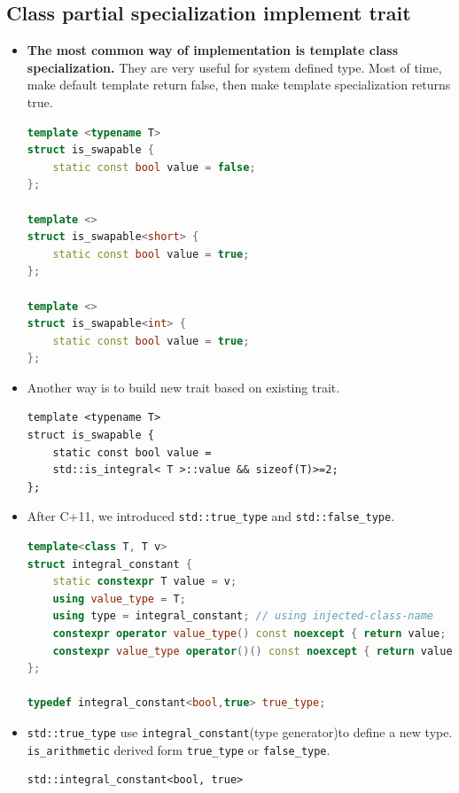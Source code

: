 \documentclass[a4paper,11pt,twoside]{book}
\begin{document}
\subsection{Class partial specialization implement trait}
\begin{itemize}
	
	\item \textbf{The most common way of implementation is template class specialization.} They are very useful for system defined type. Most of time, make default template return false, then make template specialization returns true. 
\begin{lstlisting}[frame=single, language=c++]
template <typename T>
struct is_swapable {
	static const bool value = false;
};

template <>
struct is_swapable<short> {
	static const bool value = true;
};

template <>
struct is_swapable<int> {
	static const bool value = true;
};
\end{lstlisting}

\item Another way is to build new trait based on existing trait.
\begin{lstlisting}[numbers=none]
template <typename T>
struct is_swapable {
	static const bool value = 
	std::is_integral< T >::value && sizeof(T)>=2;
};
\end{lstlisting}

	\item After C+11, we introduced \texttt{std::true\_type} and \texttt{std::false\_type}.
\begin{lstlisting}[frame=single, language=c++]
template<class T, T v>
struct integral_constant {
	static constexpr T value = v;
	using value_type = T;
	using type = integral_constant; // using injected-class-name
	constexpr operator value_type() const noexcept { return value; }
	constexpr value_type operator()() const noexcept { return value; } //since c++14
};
	
typedef integral_constant<bool,true> true_type;
\end{lstlisting}


\item \texttt{std::true\_type} use \texttt{integral\_constant}(type generator)to define a new type. \newline 
\texttt{is\_arithmetic} derived form \texttt{true\_type} or \texttt{false\_type}.
\begin{lstlisting}[numbers=none]
std::integral_constant<bool, true>


\end{lstlisting}
\end{itemize}
\end{document}
